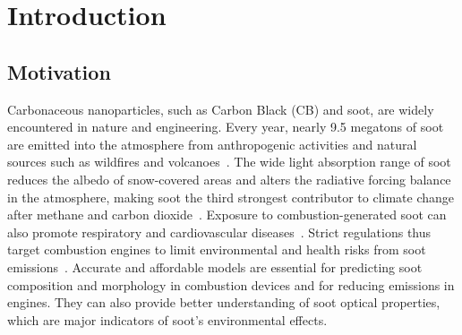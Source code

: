 \chapter{Introduction}

\section{Motivation}

Carbonaceous nanoparticles, such as Carbon Black (CB) and soot, are widely encountered in nature and engineering. Every year, nearly 9.5 megatons of soot are emitted into the atmosphere from anthropogenic activities and natural sources such as wildfires and volcanoes~\citep{myhre2014anthropogenic}. The wide light absorption range of soot reduces the albedo of snow-covered areas and alters the radiative forcing balance in the atmosphere, making soot the third strongest contributor to climate change after methane and carbon dioxide~\citep{myhre2014anthropogenic}. Exposure to combustion-generated soot can also promote respiratory and cardiovascular diseases~\citep{world2013health}. Strict regulations thus target combustion engines to limit environmental and health risks from soot emissions~\citep{integrated2019}. Accurate and affordable models are essential for predicting soot composition and morphology in combustion devices and for reducing emissions in engines. They can also provide better understanding of soot optical properties, which are major indicators of soot's environmental effects.


